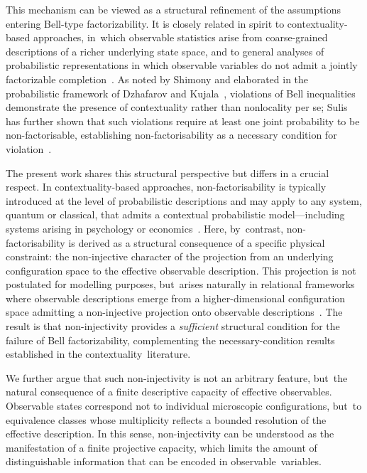 \documentclass[quantumrep,article,accept,pdftex,oneauthor]{Definitions/mdpi}
\theoremstyle{remark}
\begin{document}
    This mechanism can be viewed as a structural refinement of the assumptions entering
    Bell-type factorizability.
    It is closely related in spirit to contextuality-based approaches, in~which observable
    statistics arise from coarse-grained descriptions of a richer underlying state space,
    and to general analyses of probabilistic representations in which observable variables
    do not admit a jointly factorizable completion~\cite{Dzhafarov2017,AbramskyBrandenburger2011,Amaral2018}.
    As noted by Shimony and elaborated in the probabilistic framework of Dzhafarov and
    Kujala~\cite{Dzhafarov2017}, violations of Bell inequalities demonstrate the presence
    of contextuality rather than nonlocality per se; Sulis has further shown that such
    violations require at least one joint probability to be non-factorisable, establishing
    non-factorisability as a necessary condition for violation~\cite{Sulis2025}.

    The present work shares this structural perspective but differs in a crucial respect.
    In contextuality-based approaches, non-factorisability is typically introduced at the
    level of probabilistic descriptions and may apply to any system, quantum or classical,
    that admits a contextual probabilistic model---including systems arising in psychology
    or economics~\cite{Haven2014,Sulis2025}.
    Here, by~contrast, non-factorisability is derived as a structural consequence of a
    specific physical constraint: the non-injective character of the projection from an
    underlying configuration space to the effective observable description.
    This projection is not postulated for modelling purposes, but~arises naturally in
    relational frameworks where observable descriptions emerge from a higher-dimensional
    configuration space admitting a non-injective projection
    onto observable descriptions~\cite{Beau2026a}.
    The result is that non-injectivity provides a \emph{sufficient} structural condition
    for the failure of Bell factorizability, complementing the necessary-condition results
    established in the contextuality~literature.

    We further argue that such non-injectivity is not an arbitrary feature, but~the natural
    consequence of a finite descriptive capacity of effective observables.
    Observable states correspond not to individual microscopic configurations, but~to
    equivalence classes whose multiplicity reflects a bounded resolution of the effective
    description.
    In this sense, non-injectivity can be understood as the manifestation of a finite
    projective capacity, which limits the amount of distinguishable information that can
    be encoded in observable~variables.
\end{document}

